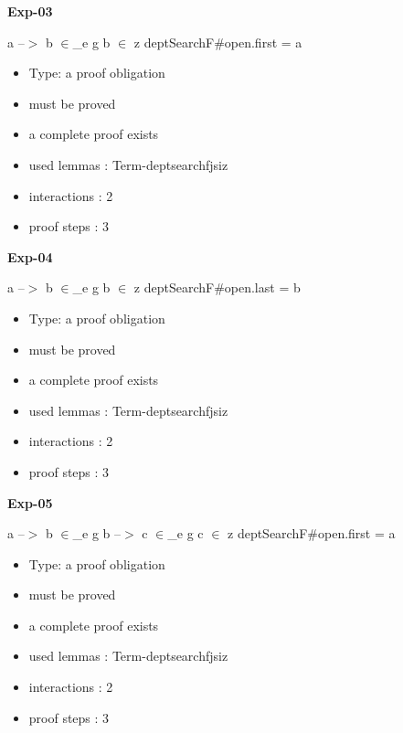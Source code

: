 \documentclass[a4paper]{article}
\begin{document}
\medskip

{\LARGE\bf Exp-03}\label{lemma-Exp-03}

\medskip

 \Fol a --$>$ b $\in$\_e g \And b $\in$ z \Imp \Do deptSearchF\#\Dc open.first = a

\begin{itemize}

\item Type: a proof obligation

\item       must be proved
\item       a complete proof exists
\item       used lemmas  : Term-deptsearchfjsiz
\item       interactions : 2
\item       proof steps  : 3
\end{itemize}

\medskip

{\LARGE\bf Exp-04}\label{lemma-Exp-04}

\medskip

 \Fol a --$>$ b $\in$\_e g \And b $\in$ z \Imp \Do deptSearchF\#\Dc open.last = b

\begin{itemize}

\item Type: a proof obligation

\item       must be proved
\item       a complete proof exists
\item       used lemmas  : Term-deptsearchfjsiz
\item       interactions : 2
\item       proof steps  : 3
\end{itemize}

\medskip

{\LARGE\bf Exp-05}\label{lemma-Exp-05}

\medskip

 \Fol a --$>$ b $\in$\_e g \And b --$>$ c $\in$\_e g \And c $\in$ z \Imp \Do deptSearchF\#\Dc open.first = a

\begin{itemize}

\item Type: a proof obligation

\item       must be proved
\item       a complete proof exists
\item       used lemmas  : Term-deptsearchfjsiz
\item       interactions : 2
\item       proof steps  : 3
\end{itemize}
\end{document}
